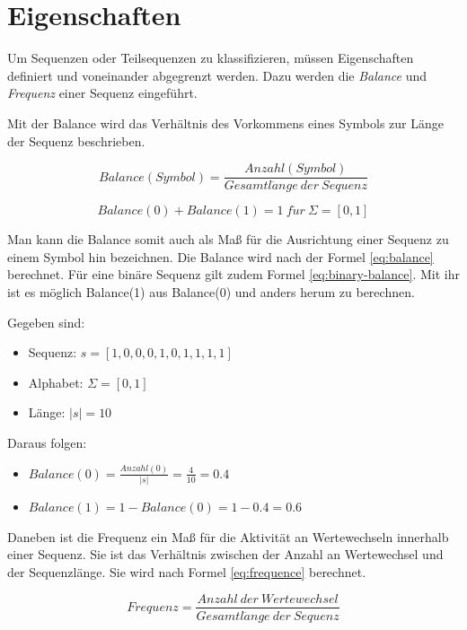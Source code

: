 \section{Eigenschaften}
\label{properties}
Um Sequenzen oder Teilsequenzen zu klassifizieren, müssen Eigenschaften definiert und voneinander abgegrenzt werden. Dazu werden die \textit{Balance} und \textit{Frequenz} einer Sequenz eingeführt.

Mit der Balance wird das Verhältnis des Vorkommens eines Symbols zur Länge der Sequenz beschrieben. 

\begin{equation}
\label{eq:balance}
Balance(Symbol) = \frac{Anzahl(Symbol)}{Gesamtl\ddot{a}nge\ der\ Sequenz}
\end{equation}

\begin{equation}
\label{eq:binary-balance}
Balance(0) + Balance(1) = 1\ f\ddot{u}r\ \Sigma = [0,1]
\end{equation}

Man kann die Balance somit auch als Maß für die Ausrichtung einer Sequenz zu einem Symbol hin bezeichnen. Die Balance wird nach der Formel \ref{eq:balance} berechnet. Für eine binäre Sequenz gilt zudem Formel \ref{eq:binary-balance}. Mit ihr ist es möglich Balance(1) aus Balance(0) und anders herum zu berechnen.

\begin{theorem}
Gegeben sind:
\begin{itemize}[noitemsep]
	\item Sequenz: $s = [1,0,0,0,1,0,1,1,1,1]$
	\item Alphabet: $\Sigma = [0,1]$
	\item Länge: $|s| = 10$
\end{itemize}
Daraus folgen:
\begin{itemize}
	\item [] $Balance(0) = \frac{Anzahl(0)}{|s|} = \frac{4}{10} = 0.4$
	\item [] $Balance(1) = 1 - Balance(0) = 1 - 0.4 = 0.6$
\end{itemize}
\end{theorem}

Daneben ist die Frequenz ein Maß für die Aktivität an Wertewechseln innerhalb einer Sequenz. Sie ist das Verhältnis zwischen der Anzahl an Wertewechsel und der Sequenzlänge. Sie wird nach Formel \ref{eq:frequence} berechnet. 

\begin{equation}
\label{eq:frequence}
Frequenz = \frac{Anzahl\ der\ Wertewechsel}{Gesamtl\ddot{a}nge\ der\ Sequenz}
\end{equation}

